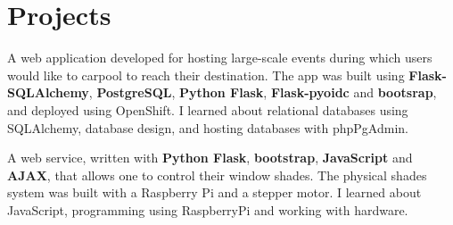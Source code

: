 \documentclass[]{deedy-resume-openfont}
\begin{document}
\begin{minipage}[t]{0.67\textwidth}


\section{Projects}
A web application developed for hosting large-scale events during which users would like to carpool to reach their destination.
The app was built using \textbf{Flask-SQLAlchemy}, \textbf{PostgreSQL}, \textbf{Python Flask}, \textbf{Flask-pyoidc} and \textbf{bootsrap}, and deployed using OpenShift.
I learned about relational databases using SQLAlchemy, database design, and hosting databases with phpPgAdmin.
\sectionsep


A web service, written with \textbf{Python Flask}, \textbf{bootstrap}, \textbf{JavaScript} and \textbf{AJAX}, that allows one to control their window shades. The physical shades system was built with a Raspberry Pi and a stepper motor. I learned about JavaScript, programming using RaspberryPi and working with hardware.



\end{minipage}
\end{document}
